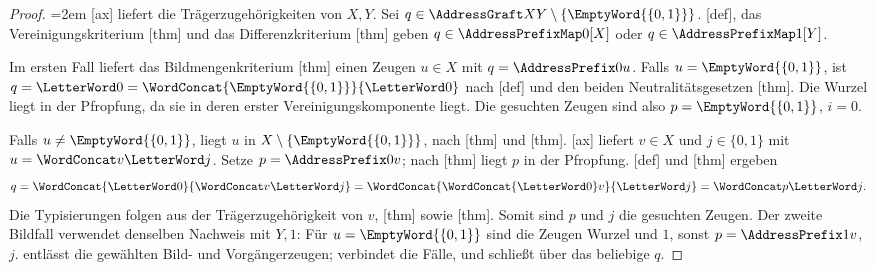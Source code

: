 \begin{proof}
\emergencystretch=2em
[ax] liefert die
Trägerzugehörigkeiten von \(X,Y\).
Sei \(q\in\AddressGraft X Y\setminus\{\EmptyWord{\{0,1\}}\}\).
[def], das Vereinigungskriterium
[thm]
und das Differenzkriterium
[thm]
geben \(q\in\AddressPrefixMap0[X]\) oder
\(q\in\AddressPrefixMap1[Y]\).

Im ersten Fall liefert das Bildmengenkriterium
[thm]
einen Zeugen \(u\in X\) mit \(q=\AddressPrefix0u\).
Falls \(u=\EmptyWord{\{0,1\}}\), ist
\(q=\LetterWord0=\WordConcat{\EmptyWord{\{0,1\}}}{\LetterWord0}\)
nach [def] und den beiden
Neutralitätsgesetzen [thm].
Die Wurzel liegt in der Pfropfung, da sie in deren erster
Vereinigungskomponente liegt. Die gesuchten Zeugen sind also
\(p=\EmptyWord{\{0,1\}}\), \(i=0\).

Falls \(u\ne\EmptyWord{\{0,1\}}\), liegt \(u\) in
\(X\setminus\{\EmptyWord{\{0,1\}}\}\), nach
[thm] und
[thm].
[ax] liefert
\(v\in X\) und \(j\in\{0,1\}\) mit
\(u=\WordConcat v{\LetterWord j}\). Setze
\(p=\AddressPrefix0v\); nach
[thm] liegt \(p\) in der
Pfropfung. [def] und
[thm] ergeben
\[
 q=\WordConcat{\LetterWord0}{\WordConcat v{\LetterWord j}}
  =\WordConcat{\WordConcat{\LetterWord0}v}{\LetterWord j}
  =\WordConcat p{\LetterWord j}.
\]
Die Typisierungen folgen aus der Trägerzugehörigkeit von \(v\),
[thm] sowie
[thm].
Somit sind \(p\) und \(j\) die gesuchten Zeugen.
Der zweite Bildfall verwendet denselben Nachweis mit \(Y,1\):
Für \(u=\EmptyWord{\{0,1\}}\) sind die Zeugen Wurzel und \(1\),
sonst \(p=\AddressPrefix1v\), \(j\).
\rEE{} entlässt die gewählten Bild- und Vorgängerzeugen;
\rOE{} verbindet die Fälle, und \rUI{} schließt
über das beliebige \(q\).
\end{proof}


